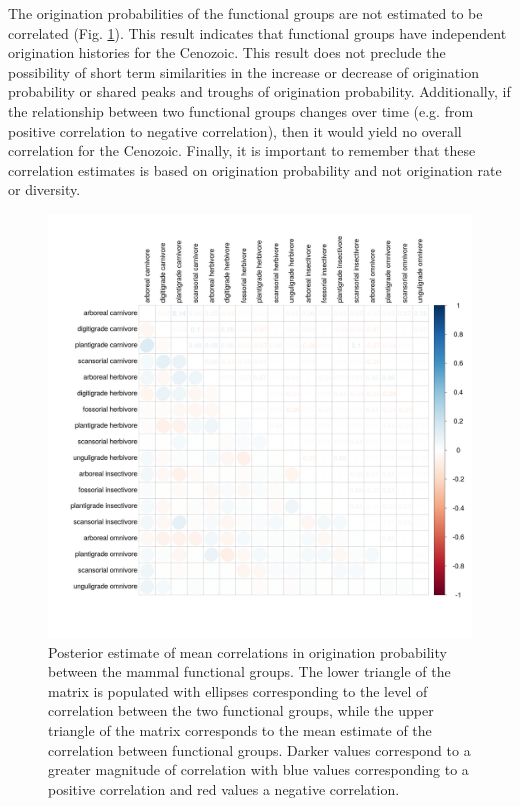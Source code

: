 \documentclass[12pt,letterpaper]{article}
\begin{document}
The origination probabilities of the functional groups are not estimated to be correlated (Fig. \ref{fig:origin_corr}). This result indicates that functional groups have independent origination histories for the Cenozoic. This result does not preclude the possibility of short term similarities in the increase or decrease of origination probability or shared peaks and troughs of origination probability. Additionally, if the relationship between two functional groups changes over time (e.g. from positive correlation to negative correlation), then it would yield no overall correlation for the Cenozoic. Finally, it is important to remember that these correlation estimates is based on origination probability and not origination rate or diversity.
\begin{figure}[ht]
  \centering
  \includegraphics[width=\textwidth,height=\textheight,keepaspectratio=true]{figure/origination_correlation}
  \caption{Posterior estimate of mean correlations in origination probability between the mammal functional groups. The lower triangle of the matrix is populated with ellipses corresponding to the level of correlation between the two functional groups, while the upper triangle of the matrix corresponds to the mean estimate of the correlation between functional groups. Darker values correspond to a greater magnitude of correlation with blue values corresponding to a positive correlation and red values a negative correlation.}
  \label{fig:origin_corr}
\end{figure}
\end{document}
